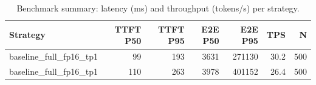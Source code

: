 \begin{table}
\caption{Benchmark summary: latency (ms) and throughput (tokens/s) per strategy.}
\label{tab:summary}
\begin{tabular}{lrrrrrr}
\toprule
Strategy & TTFT P50 & TTFT P95 & E2E P50 & E2E P95 & TPS & N \\
\midrule
baseline_full_fp16_tp1 & 99 & 193 & 3631 & 271130 & 30.2 & 500 \\
baseline_full_fp16_tp1 & 110 & 263 & 3978 & 401152 & 26.4 & 500 \\
\bottomrule
\end{tabular}
\end{table}
